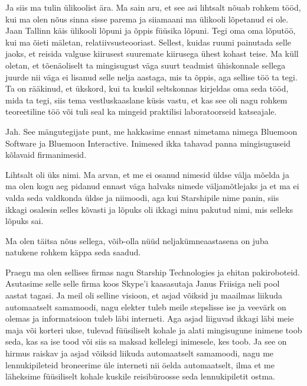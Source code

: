 Ja siis ma tulin ülikoolist ära. Ma sain aru, et see asi lihtsalt nõuab rohkem 
tööd, kui ma olen nõus sinna sisse parema ja siiamaani ma ülikooli lõpetanud ei 
ole. Jaan Tallinn käis ülikooli lõpuni ja õppis 
füüsika lõpuni. Tegi oma oma lõputöö, kui ma õieti mäletan, 
relatiivsusteooriast. Sellest, kuidas ruumi painutada selle jaoks, et reisida 
valguse kiirusest suuremate kiirusega ühest kohast teise. Ma küll oletan, et 
tõenäoliselt  ta mingisugust väga suurt teadmist ühiskonnale sellega juurde nii 
väga ei lisanud selle nelja aastaga, mis ta õppis, aga sellise töö ta tegi. Ta 
on rääkinud, et ükskord, kui ta kuskil seltskonnas kirjeldas oma seda tööd, 
mida ta tegi, siis tema vestluskaaslane küsis  vastu, et kas see oli nagu 
rohkem teoreetiline töö või tuli seal ka mingeid praktilisi laboratoorseid 
katseajale.

\label{sisu!bluemoon}

Jah. See mängutegijate punt, me hakkasime ennast nimetama nimega Bluemoon 
Software ja Bluemoon Interactive. Inimesed ikka tahavad panna mingisuguseid 
kõlavaid firmanimesid.


Lihtsalt oli üks nimi. Ma arvan, et me ei osanud nimesid üldse välja mõelda ja 
ma olen kogu aeg pidanud ennast väga halvaks nimede väljamõtlejaks ja et ma ei 
valda seda valdkonda üldse ja niimoodi, aga kui Starshipile nime panin, siis ikkagi osalesin selles kõvasti ja  lõpuks oli 
ikkagi minu pakutud nimi, mis selleks lõpuks sai.


Ma olen täitsa nõus sellega, võib-olla nüüd neljakümneaastasena on juba 
natukene rohkem käppa seda saadud. 


Praegu ma olen sellises firmas nagu Starship Technologies ja ehitan 
pakiroboteid. Asutasime selle selle firma koos Skype'i kaasasutaja 
Janus Friisiga  neli pool aastat 
tagasi. Ja meil oli selline 
visioon, et asjad võiksid ju maailmas liikuda automaatselt samamoodi, nagu 
elekter tuleb meile stepslisse  ise  ja veevärk on olemas ja 
informatsioon tuleb läbi interneti. Aga asjad liiguvad ikkagi  läbi meie maja 
või korteri ukse, tulevad füüsiliselt kohale ja alati mingisugune inimene toob 
seda, kas sa ise tood või siis sa maksad kellelegi inimesele, kes toob. Ja see 
on hirmus raiskav ja asjad võiksid liikuda automaatselt samamoodi, nagu me 
lennukipileteid broneerime üle interneti nii öelda automaatselt, ilma et me 
läheksime füüsiliselt kohale kuskile reisibüroosse seda lennukipiletit ostma.

